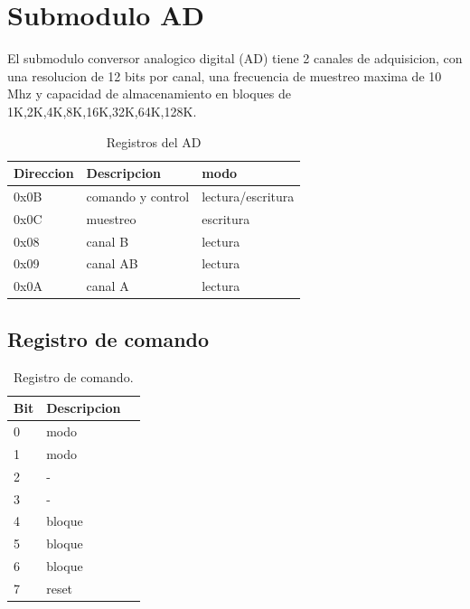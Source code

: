 \section{Submodulo AD}

El submodulo conversor analogico digital (AD) tiene 2 canales de adquisicion,
con una resolucion de 12 bits por canal, una frecuencia de muestreo maxima de 10 Mhz 
y capacidad de almacenamiento en bloques de 1K,2K,4K,8K,16K,32K,64K,128K.

\begin{table}[ht]
    \centering
    \begin{tabular}{|l|l|l|}
    \hline
     Direccion   & Descripcion       & modo\\
    \hline
     0x0B        & comando y control & lectura/escritura\\ 
    \hline
     0x0C        & muestreo          & escritura\\
     \hline
     0x08        & canal B           &lectura   \\
     \hline
     0x09        & canal AB          &lectura   \\
     \hline
     0x0A        & canal A           &lectura   \\
     \hline
\end{tabular}
\caption{\label{tab:registros_ad} Registros del AD}
\end{table}

\subsection{Registro de comando}
\begin{table}[ht]
    \centering
    \begin{tabular}{|l|l|l|}
    \hline
    Bit    & Descripcion \\
    \hline
     0 & modo\\ 
    \hline
     1 & modo\\
     \hline
     2 & - \\
     \hline
     3 & - \\
     \hline
     4 & bloque \\
     \hline
     5 & bloque \\
     \hline
     6 & bloque \\
     \hline
     7 & reset \\
     \hline
\end{tabular}
\caption{\label{tab:registros_ad_cmd}Registro de comando.}
\end{table}


